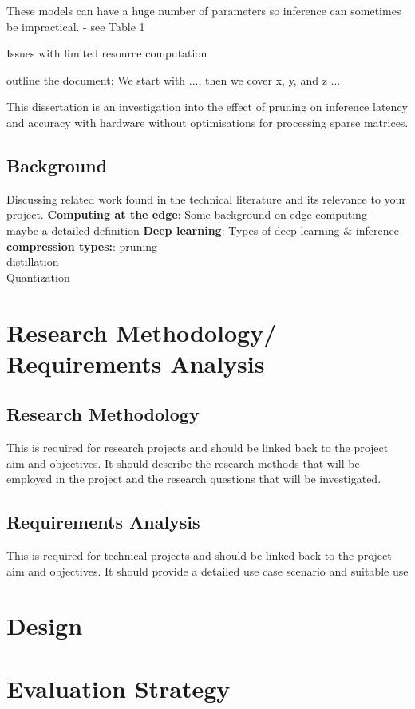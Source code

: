 \documentclass[11pt]{article}
\begin{document}
These models can have a huge number of parameters so inference can sometimes be impractical.
\autocite{chenDeepLearningMobile2020} - see Table 1

Issues with limited resource computation

outline the document: We start with ..., then we cover x, y, and z ...

This dissertation is an investigation into the effect of pruning on inference latency and accuracy with 
hardware without optimisations for processing sparse matrices.

\subsection{Background}
Discussing related work found in the technical literature and its relevance to your
project.
\textbf{Computing at the edge}:
Some background on edge computing - maybe a detailed definition
\textbf{Deep learning}:
Types of deep learning \& inference
\textbf{compression types:}:
pruning\\
distillation\\
Quantization\\


\section{Research Methodology/ Requirements Analysis}
\subsection{Research Methodology}
This is required for research projects and should be linked
back to the project aim and objectives. It should describe the research methods that
will be employed in the project and the research questions that will be investigated.

\subsection{Requirements Analysis}
This is required for technical projects and should be linked
back to the project aim and objectives. It should provide a detailed use case scenario
and suitable use

\section{Design}

\section{Evaluation Strategy}
\end{document}
